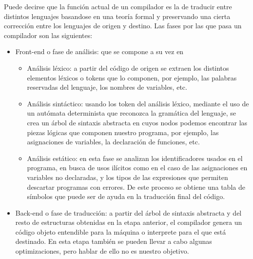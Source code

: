 Puede decirse que la función actual de un compilador es la de traducir entre distintos lenguajes basandose en una teoría formal y preservando una cierta corrección entre los lenguajes de origen y destino. Las fases por las que pasa un compilador son las siguientes:
\begin{itemize}
\item Front-end o fase de análisis: que se compone a su vez en
  \begin{itemize}
  \item Análisis léxico: a partir del código de origen se extraen los distintos elementos léxicos o tokens que lo componen, por ejemplo, las palabras reservadas del lenguaje, los nombres de variables, etc.
  \item Análisis sintáctico: usando los token del análisis léxico, mediante el uso de un autómata determinista que reconozca la gramática del lenguaje, se crea un árbol de sintaxis abstracta en cuyos nodos podemos encontrar las piezas lógicas que componen nuestro programa, por ejemplo, las asignaciones de variables, la declaración de funciones, etc.
  \item Análisis estático: en esta fase se analizan los identificadores usados en el programa, en busca de usos ilícitos como en el caso de las asignaciones en variables no declaradas, y los tipos de las expresiones que permiten descartar programas con errores. De este proceso se obtiene una tabla de símbolos que puede ser de ayuda en la traducción final del código.
  \end{itemize}
\item Back-end o fase de traducción: a partir del árbol de sintaxis abstracta y del resto de estructuras obtenidas en la etapa anterior, el compilador genera un código objeto entendible para la máquina o interprete para el que está destinado. En esta etapa también se pueden llevar a cabo algunas optimizaciones, pero hablar de ello no es nuestro objetivo.
\end{itemize}
